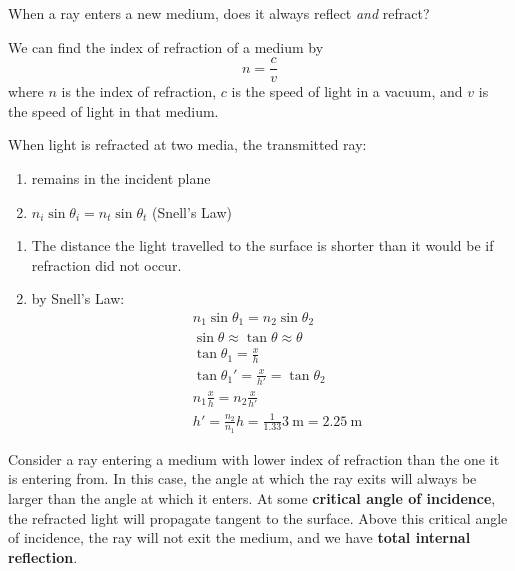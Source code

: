 \begin{question}
    When a ray enters a new medium, does it always reflect \textit{and} refract?
\end{question}

\begin{theorem}
    We can find the index of refraction of a medium by
    $$n = \frac{c}{v}$$
    where $n$ is the index of refraction, $c$ is the speed of light in a vacuum, and $v$ is the speed of light in that medium.
\end{theorem}

\begin{theorem}
    When light is refracted at two media, the transmitted ray:
    \begin{enumerate}
        \item remains in the incident plane
        \item $n_i \sin \theta_i = n_t \sin \theta_t$ (Snell's Law)
    \end{enumerate}
\end{theorem}



\begin{example}
    \spacebeforelist
    \begin{enumerate}
        \item The distance the light travelled to the surface is shorter than it would be if refraction did not occur.
        \item by Snell's Law: 
        \begin{align*}
            &n_1 \sin \theta_1 = n_2 \sin \theta_2 \\
            &\sin \theta \approx \tan \theta \approx \theta \\
            &\tan \theta_1 = \frac{x}{h} \\
            &\tan \theta_1' = \frac{x}{h'} = \tan \theta_2 \\
            &n_1 \frac{x}{h} = n_2 \frac{x}{h'} \\
            &h' = \frac{n_2}{n_1} h = \frac{1}{1.33} \qty{3}{\metre} = \qty{2.25}{\metre}
        \end{align*}
    \end{enumerate}
\end{example}

\begin{definition}
    Consider a ray entering a medium with lower index of refraction than the one it is entering from. In this case, the angle at which the ray exits will always be larger than the angle at which it enters. At some \textbf{critical angle of incidence}, the refracted light will propagate tangent to the surface. Above this critical angle of incidence, the ray will not exit the medium, and we have \textbf{total internal reflection}.
\end{definition}

